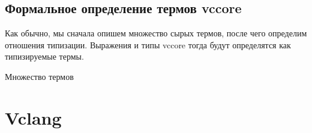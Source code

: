 \documentclass{amsart}
\theoremstyle{definition}
\theoremstyle{remark}
\numberwithin{figure}{section}
\begin{document}
\subsection{Формальное определение термов vccore}

Как обычно, мы сначала опишем множество сырых термов, после чего определим отношения типизации.
Выражения и типы vccore тогда будут определятся как типизируемые термы.

Множество термов

\section{Vclang}





\end{document}
